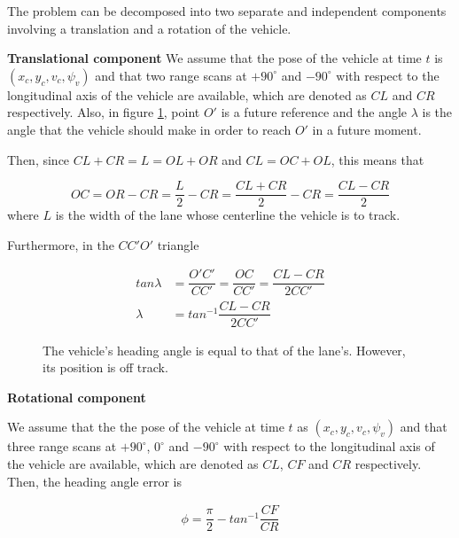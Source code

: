 \documentclass[oneside,12pt]{article}
\begin{document}
    The problem can be decomposed into two separate and independent
    components involving a translation and a rotation of the vehicle.


    \textbf{Translational component}
    We assume that the pose of the vehicle at time $t$ is
    $(x_c, y_c, v_c, \psi_v)$ and that two range scans at $+90^\circ$ and
    $-90^\circ$ with respect to the longitudinal axis of the
    vehicle are available, which are denoted as $CL$ and $CR$ respectively. Also,
    in figure \ref{fig:centerline_pid_translation}, point $O'$ is a future
    reference and the angle $\lambda$ is the angle that the vehicle should
    make in order to reach $O'$ in a future moment.

    Then, since $CL + CR = L = OL + OR$ and $CL = OC + OL$, this means that

    \begin{equation}
      OC = OR - CR = \dfrac{L}{2} - CR = \dfrac{CL + CR}{2} - CR = \dfrac{CL-CR}{2}
    \end{equation}
    where $L$ is the width of the lane whose centerline the vehicle is to track.

    Furthermore, in the $CC'O'$ triangle

    \begin{align}
      tan\lambda &= \dfrac{O'C'}{CC'} = \dfrac{OC}{CC'} = \dfrac{CL-CR}{2CC'} \\
      \lambda &= tan^{-1}\dfrac{CL-CR}{2CC'}
    \end{align}


    \begin{figure}[H]\centering
      \scalebox{1}{}
      \caption{The vehicle's heading angle is equal to that of the lane's.
        However, its position is off track.}
      \label{fig:centerline_pid_translation}
    \end{figure}

    \textbf{Rotational component}


    We assume that the the pose of the vehicle at time $t$ as
    $(x_c, y_c, v_c, \psi_v)$ and that three range scans
    at $+90^\circ$, $0^\circ$ and $-90^\circ$ with respect to the
    longitudinal axis of the vehicle are available, which are denoted as
    $CL$, $CF$ and $CR$ respectively. Then, the heading angle error is

    \begin{align}
      \phi = \dfrac{\pi}{2} - tan^{-1}\dfrac{CF}{CR}
    \end{align}
\end{document}
